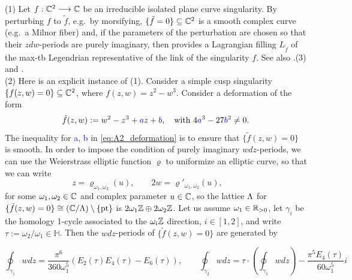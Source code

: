 \begin{example}\label{ex:special_fillings} (1) Let $f:\mathbb{C}^2\longrightarrow\mathbb{C}$ be an irreducible isolated plane curve singularity. By perturbing $f$ to $\tilde{f}$, e.g.~by morsifying, $\{\tilde{f}=0\}\subseteq\mathbb{C}^2$ is a smooth complex curve (e.g.~a Milnor fiber) and, if the parameters of the perturbation are chosen so that their $zdw$-periods are purely imaginary, then  provides a Lagrangian filling $L_{\tilde{f}}$ of the max-tb Legendrian representative of the link of the singularity $f$. See also .(3) and \cite{CasalsLagSkel}.\\

\noindent (2) Here is an explicit instance of (1). Consider a simple cusp singularity $\{f(z,w)=0\}\subseteq\mathbb{C}^2$, where $f(z,w)=z^2-w^3$. Consider a deformation of the form
\begin{equation}\label{eq:A2_deformation}
\tilde{f}(z,w):=w^2-z^3+\textcolor{blue}{a}z+\textcolor{blue}{b},\quad\mbox{with } 
4\textcolor{blue}{a}^3-27\textcolor{blue}{b}^2\neq0.\end{equation}
\noindent The inequality for \textcolor{blue}{a}, \textcolor{blue}{b} in \eqref{eq:A2_deformation} is to ensure that $\{\tilde{f}(z,w)=0\}$ is smooth. In order to impose the condition of purely imaginary $wdz$-periods, we can use the Weierstrass elliptic function $\varrho$ to uniformize an elliptic curve, so that we can write
$$z=\varrho_{\omega_1,\omega_2}(u),\qquad 2w=\varrho'_{\omega_1,\omega_2}(u),\qquad $$
for some $\omega_1,\omega_2\in\mathbb{C}$ and complex parameter $u\in\mathbb{C}$, so the lattice $\Lambda$ for $\{\tilde{f}(z,w)=0\}\cong(\mathbb{C}/\Lambda)\setminus\{\operatorname{pt}\}$ is $2\omega_1\mathbb{Z}\oplus 2\omega_2\mathbb{Z}$. Let us assume $\omega_1\in\mathbb{R}_{>0}$, let $\gamma_i$ be the homology 1-cycle associated to the $\omega_i\mathbb{Z}$ direction, $i\in[1,2]$, and write $\tau:=\omega_2/\omega_1\in\mathbb{H}$. Then the $wdz$-periods of $\{\tilde{f}(z,w)=0\}$ are generated by

$$\oint_{\gamma_1} wdz=\frac{\pi^6}{360\omega_1^5}(E_2(\tau)E_4(\tau)-E_6(\tau)),\qquad \oint_{\gamma_2} wdz=\tau\cdot\left(\oint_{\gamma_1} wdz\right)-\frac{\pi^5E_4(\tau)}{60\omega_1^5}i$$


\end{example}
